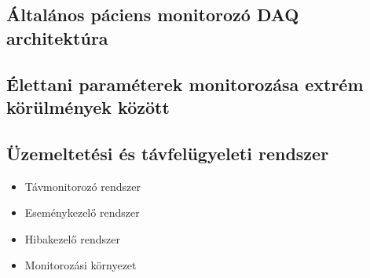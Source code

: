 \subsection{Általános páciens monitorozó DAQ architektúra}

\subsection{Élettani paraméterek monitorozása extrém körülmények között}
\begin{center}
\end{center}

\subsection{Üzemeltetési és távfelügyeleti rendszer}
\begin{itemize}
    \item Távmonitorozó rendszer
    \item Eseménykezelő rendszer
    \item Hibakezelő rendszer
    \item Monitorozási környezet
\end{itemize}